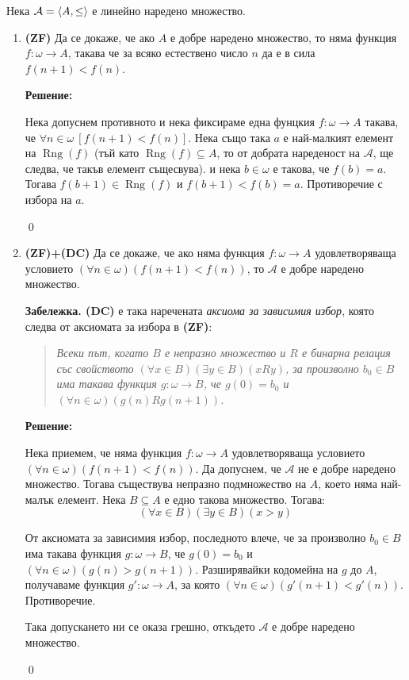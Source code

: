 \begin{problem}
Нека $\mathcal{A} = \langle A, \leq \rangle$ е линейно наредено множество.
\begin{enumerate}
\item
\textbf{(ZF)} Да се докаже, че ако $A$ е добре наредено множество, то
няма функция $f: \omega \to A$, такава че за всяко естествено число $n$ да
е в сила $f (n + 1) < f (n)$.

\textbf{Решение:}

\smallbreak
\quad
Нека допуснем противното и
нека фиксираме една фунцкия $f: \omega \to A$ такава, че $\forall n \in \omega\ [f(n+1) < f(n)]$.
Нека също така $a$ е най-малкият елемент на $\operatorname{Rng}(f)$
(тъй като $\operatorname{Rng}(f) \subseteq A$, то от добрата нареденост на $\mathcal{A}$, ще следва, че такъв елемент същесвува).
и нека $b \in \omega$ е такова, че $f(b) = a$.
Тогава $f(b+1) \in \operatorname{Rng}(f)$ и $f(b+1) < f(b) = a$.
Противоречие с избора на $a$.

\qed

\item
\textbf{(ZF)+(DC)}
Да се докаже, че ако няма функция $f: \omega \to A$
удовлетворяваща условието $(\forall n \in \omega)(f(n+1) < f(n))$, то $\mathcal{A}$ е добре наредено множество.

\textbf{Забележка. (DC)} е така наречената \textit{аксиома за зависимия избор},
която следва от аксиомата за избора в \textbf{(ZF)}:
\begin{quote}
\textit{
Всеки път, когато $B$ е непразно множество и $R$ е бинарна
релация със свойството $(\forall x \in B)(\exists y \in B)(xRy)$,
за произволно $b_0 \in B$ има такава функция $g: \omega \to B$, че $g(0) = b_0$ и
$(\forall n \in \omega)(g(n)Rg(n + 1))$.
}
\end{quote}

\textbf{Решение:}

\smallbreak
\quad
Нека приемем, че няма функция $f: \omega \to A$ удовлетворяваща условието $(\forall n \in \omega)(f(n+1) < f(n))$.
Да допуснем, че $\mathcal{A}$ не е добре наредено множество.
Тогава съществува непразно подмножество на $A$,
което няма най-малък елемент.
Нека $B \subseteq A$ е едно такова множество.
Тогава:
\[
(\forall x \in B)(\exists y \in B)(x > y)
\]

\quad
От аксиомата за зависимия избор, последното влече, че
за произволно $b_0 \in B$ има такава функция $g: \omega \to B$, че $g(0) = b_0$ и
$(\forall n \in \omega)(g(n) > g(n + 1))$.
Разширявайки кодомейна на $g$ до $A$, получаваме функция $g': \omega \to A$,
за която $(\forall n \in \omega)(g'(n+1) < g'(n))$.
Противоречие.

\quad
Така допускането ни се оказа грешно, откъдето $\mathcal{A}$ е добре наредено множество.

\qed

\end{enumerate}
\end{problem}
